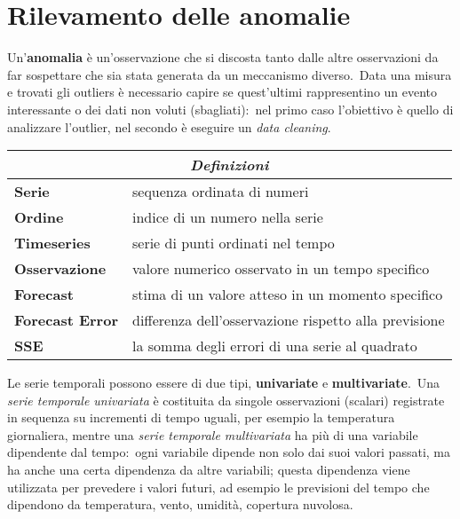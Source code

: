\section{Rilevamento delle anomalie}

Un'\textbf{anomalia} è un'osservazione che si discosta tanto dalle altre osservazioni da far sospettare che sia stata generata da un meccanismo diverso.\
Data una misura e trovati gli outliers è necessario capire se quest'ultimi rappresentino un evento interessante o dei dati non voluti (sbagliati):\ nel primo caso l'obiettivo è quello di analizzare l'outlier, nel secondo è eseguire un \textit{data cleaning}.\

\begin{table}[H]
    \centering
    \begin{tabular}{|l|l|}
        \hline
        \multicolumn{2}{|c|}{\textit{\textbf{Definizioni}}}                             \\\hline
        \textbf{Serie}          & sequenza ordinata di numeri                           \\
        \textbf{Ordine}         & indice di un numero nella serie                       \\
        \textbf{Timeseries}     & serie di punti ordinati nel tempo                     \\
        \textbf{Osservazione}   & valore numerico osservato in un tempo specifico       \\
        \textbf{Forecast}       & stima di un valore atteso in un momento specifico     \\
        \textbf{Forecast Error} & differenza dell'osservazione rispetto alla previsione \\
        \textbf{SSE}            & la somma degli errori di una serie al quadrato        \\\hline
    \end{tabular}
\end{table}

\noindent Le serie temporali possono essere di due tipi, \textbf{univariate} e \textbf{multivariate}.\
Una \textit{serie temporale univariata} è costituita da singole osservazioni (scalari) registrate in sequenza su incrementi di tempo uguali, per esempio la temperatura giornaliera, mentre una \textit{serie temporale multivariata} ha più di una variabile dipendente dal tempo:\ ogni variabile dipende non solo dai suoi valori passati, ma ha anche una certa dipendenza da altre variabili; questa dipendenza viene utilizzata per prevedere i valori futuri, ad esempio le previsioni del tempo che dipendono da temperatura, vento, umidità, copertura nuvolosa.


